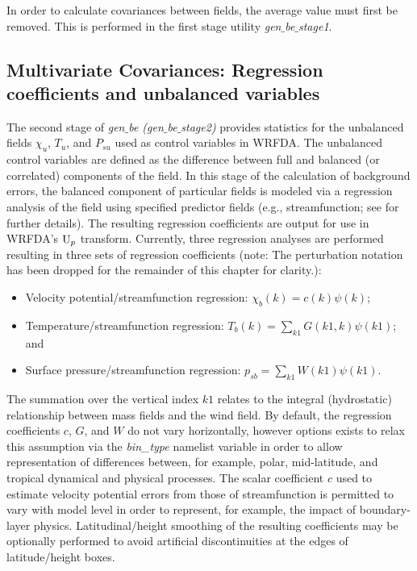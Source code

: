 In order to calculate covariances between fields, the average value must first be removed. 
This is performed in the first stage utility {\it gen$\_$be$\_$stage1}. 

\subsection{Multivariate Covariances: Regression coefficients and unbalanced variables}

The second stage
of {\it gen$\_$be (gen$\_$be$\_$stage2)} provides statistics for the
unbalanced fields $\chi_u$, $T_u$, and $P_{su}$ used as control
variables in WRFDA. The unbalanced control variables are defined as
the difference between full and balanced (or correlated) components of
the field. In this stage of the calculation of background errors, the
balanced component of particular fields is modeled via a regression
analysis of the field using specified predictor fields
(e.g., streamfunction; see
\citet{wu02} for further details). The resulting regression coefficients 
are output for use 
in WRFDA's ${\rm U}_p$ transform. Currently, three regression analyses are
performed resulting in three sets of regression coefficients (note:
The perturbation notation has been dropped for the 
remainder of this chapter for clarity.):

\begin{itemize}\setlength{\parskip}{-4pt}
\item   Velocity potential/streamfunction regression: $\chi_b(k)=c(k)\psi(k)$;
\item	Temperature/streamfunction regression: $T_b(k)=\sum_{k1}G(k1,k)\psi(k1)$; and
\item	Surface pressure/streamfunction regression: $p_{sb}=\sum_{k1}W(k1)\psi(k1)$.
\end{itemize}

The summation over the vertical index $k1$ relates to the integral (hydrostatic) relationship between
mass fields and the wind field. By default, the regression coefficients $c$, $G$, and $W$ do 
not vary horizontally, however options exists to relax this assumption via the {\it bin\_type} 
namelist variable in order to allow representation of differences between, for example, polar, mid-latitude, 
and tropical dynamical and physical processes. The scalar coefficient $c$ used to 
estimate velocity potential errors from those of streamfunction is permitted to vary with model
level in order to represent, for example, the impact of boundary-layer physics. Latitudinal/height 
smoothing of the resulting coefficients may be optionally performed to avoid artificial 
discontinuities at the edges of latitude/height boxes.


